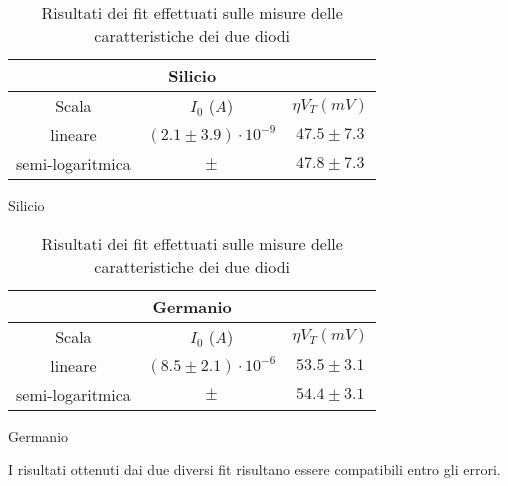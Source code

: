 \documentclass[@SRC@/main]{subfiles}
\begin{document}
    \begin{table}[h]
        \centering
        \begin{subtable}{.45\textwidth}
            \centering
            \begin{tabular}{||c|c|c||}
                \hline
                \multicolumn{3}{||c||}{Silicio} \\
                \hline
                Scala            & $I_0$ (\textit{A}) &$\eta V_T (mV)$ \\
                \hline
                lineare          &$(2.1\pm3.9)\cdot 10^{-9}$ & $47.5\pm7.3$ \\
                \hline
                semi-logaritmica &    $   \pm  $   & $47.8\pm 7.3$\\
                \hline
            \end{tabular}
            \caption{Silicio}
            \label{tab:fit-silicio}
        \end{subtable}
        \hfill
        \begin{subtable}{.45\textwidth}
            \centering
            \begin{tabular}{||c|c|c||}
                \hline
                \multicolumn{3}{||c||}{Germanio} \\
                \hline
                Scala            & $I_0$ (\textit{A}) & $\eta V_T (mV)$  \\
                \hline
                lineare          & $(8.5  \pm 2.1) \cdot 10^{-6}$ & $53.5\pm3.1$\\
                \hline
                semi-logaritmica &  $   \pm   $    & $54.4\pm 3.1$ \\
                \hline
            \end{tabular}
            \caption{Germanio}
            \label{tab:fit-germanio}
        \end{subtable}
        \caption{Risultati dei fit effettuati sulle misure delle caratteristiche dei due diodi}
        \label{tab:fit-diodi}
    \end{table}

    \noindent I risultati ottenuti dai due diversi fit risultano essere compatibili entro gli errori.
\end{document}
